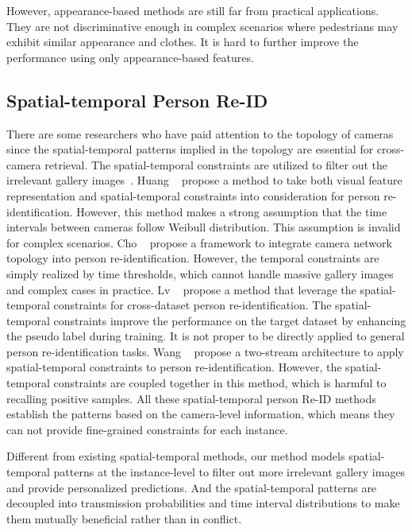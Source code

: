 \documentclass[10pt,twocolumn,letterpaper]{article}
\begin{document}
However, appearance-based methods are still far from practical applications.
They are not discriminative enough in complex scenarios where pedestrians may exhibit similar appearance and clothes.
It is hard to further improve the performance using only appearance-based features.







\subsection{Spatial-temporal Person Re-ID}

 
There are some researchers who have paid attention to the topology of cameras since the spatial-temporal patterns implied in the topology are essential for cross-camera retrieval. 
The spatial-temporal constraints are utilized to filter out the irrelevant gallery images~\cite{guangcong2019aaai, 2018Unsupervised, 2017Joint, 2016Camera}. 
Huang \etal~\cite{2016Camera} propose a method to take both visual feature representation and spatial-temporal constraints into consideration for person re-identification. However, this method makes a strong assumption that the time intervals between cameras follow Weibull distribution. This assumption is invalid for complex scenarios.  
Cho \etal ~\cite{2017Joint} propose a framework to integrate camera network topology into person re-identification. However, the temporal constraints are simply realized by time thresholds, which cannot handle massive gallery images and complex cases in practice.
Lv \etal~\cite{2018Unsupervised} propose a method that leverage the spatial-temporal constraints for cross-dataset person re-identification. The spatial-temporal constraints improve the performance on the target dataset by enhancing the pseudo label during training. 
It is not proper to be directly applied to general person re-identification tasks.
Wang \etal~\cite{guangcong2019aaai} propose a two-stream architecture to apply spatial-temporal constraints to person re-identification. However, the spatial-temporal constraints are coupled together in this method, which is harmful to recalling positive samples. 
All these spatial-temporal person Re-ID methods establish the patterns based on the camera-level information, which means they can not provide fine-grained constraints for each instance.

Different from existing spatial-temporal methods, our method models spatial-temporal patterns at the instance-level to filter out more irrelevant gallery images and provide personalized predictions. And the spatial-temporal patterns are decoupled into transmission probabilities and time interval distributions to make them mutually beneficial rather than in conflict. 
\end{document}
